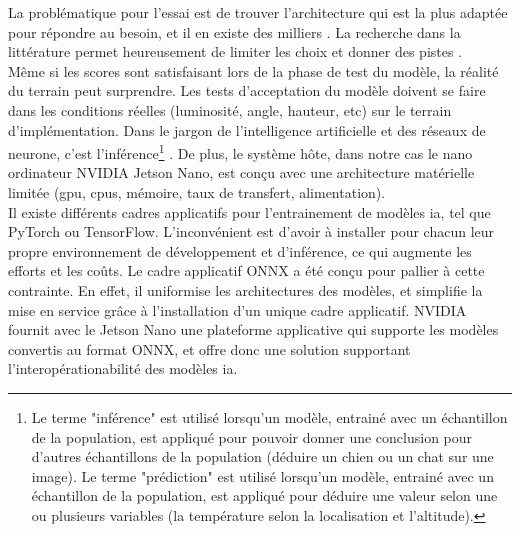 \begin{comment}
Par exemple l'architecture "VGG" prend 2-3 semaines d'entrainement \parencite{simonyan_very_2015} avec 4 \acrshort{gpu} Titan Black (NVIDIA), coutant 1,200 \$US (Amazon.com) chacun (pour un total de 4,800\$US, et cela juste pour les \acrshort{gpu}s, qui ne sont qu'un des éléments de l'infrastructure nécessaire). Étant donné que de multiples tentatives sont nécessaires (cycles essai-erreur), la stratégie est d'entrainer plusieurs modèles en parallèle afin d'accélérer le développement, ce qui implique un cout élevé en infrastructure.
\end{comment}
La problématique pour l'essai est de trouver l'architecture qui est la plus adaptée pour répondre au besoin, et il en existe des milliers \parencite{koh_model_2018}. La recherche dans la littérature permet heureusement de limiter les choix et donner des pistes \parencite{zheng_real-time_2020, nguyen_mavnet_2019, nvidia_jetson_2019-1}. 
\vspace{\baselineskip}
\\
\noindent Même si les scores sont satisfaisant lors de la phase de test du modèle, la réalité du terrain peut surprendre. Les tests d'acceptation du modèle doivent se faire dans les conditions réelles (luminosité, angle, hauteur, etc) sur le terrain d'implémentation. Dans le jargon de l'intelligence artificielle et des réseaux de neurone, c'est l'inférence\footnote{Le terme "inférence" est utilisé lorsqu'un modèle, entrainé avec un échantillon de la population, est appliqué pour pouvoir donner une conclusion pour d'autres échantillons de la population (déduire un chien ou un chat sur une image). Le terme "prédiction" est utilisé lorsqu'un modèle, entrainé avec un échantillon de la population, est appliqué pour déduire une valeur selon une ou plusieurs variables (la température selon la localisation et l'altitude).} \parencite{copel_whats_2016, nvidia_jetson_2019-1}. De plus, le système hôte, dans notre cas le nano ordinateur NVIDIA Jetson Nano, est conçu avec une architecture matérielle limitée (\acrshort{gpu}, \acrshort{cpu}s, mémoire, taux de transfert, alimentation). 
\vspace{\baselineskip}
\\
\noindent Il existe différents cadres applicatifs pour l'entrainement de modèles \acrshort{ia}, tel que PyTorch ou TensorFlow. L'inconvénient est d'avoir à installer pour chacun leur propre environnement de développement et d'inférence, ce qui augmente les efforts et les coûts. Le cadre applicatif ONNX a été conçu pour pallier à cette contrainte. En effet, il uniformise les architectures des modèles, et simplifie la mise en service grâce à l'installation d'un unique cadre applicatif. NVIDIA fournit avec le Jetson Nano une plateforme applicative qui supporte les modèles convertis au format ONNX, et offre donc une solution supportant l'interopérationabilité des modèles \acrshort{ia}. 